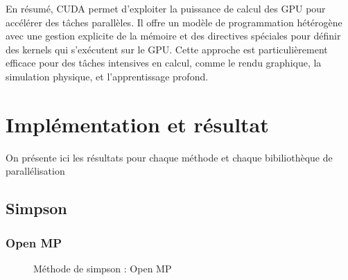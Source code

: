 \documentclass[10pt,a4paper]{article}
\begin{document}
En résumé, CUDA permet d'exploiter la puissance de calcul des GPU pour accélérer des tâches parallèles. Il offre un modèle de programmation hétérogène avec une gestion explicite de la mémoire et des directives spéciales pour définir des kernels qui s'exécutent sur le GPU. Cette approche est particulièrement efficace pour des tâches intensives en calcul, comme le rendu graphique, la simulation physique, et l'apprentissage profond.

\clearpage
\section{Implémentation et résultat}
On présente ici les résultats pour chaque méthode et chaque bibiliothèque de parallélisation

\subsection{Simpson}

\subsubsection{Open MP}

\begin{figure}[ht!]
    \centering

    \hfill %
  
    \caption{Méthode de simpson : Open MP}
    \label{fig:figure}
  \end{figure}
\end{document}
